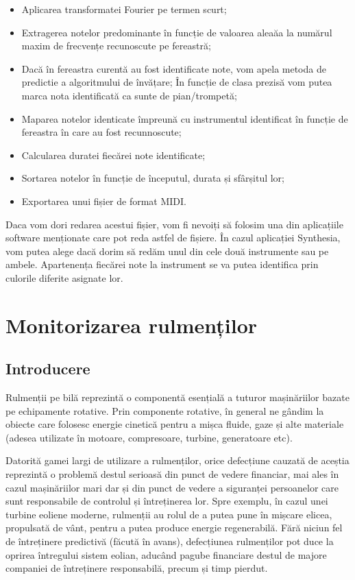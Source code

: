 \documentclass[a4paper,12pt]{report}
\begin{document}
	\begin{itemize}
		\item Aplicarea transformatei Fourier pe termen scurt;
		\item Extragerea notelor predominante în funcție de valoarea aleaăa la numărul maxim de frecvențe recunoscute pe fereastră;
		\item Dacă în fereastra curentă au fost identificate note, vom apela metoda de predictie a algoritmului de învățare; În funcție de clasa prezisă vom putea marca nota identificată ca sunte de pian/trompetă;
		\item Maparea notelor identicate împreună cu instrumentul identificat în funcție de fereastra în care au fost recunnoscute;
		\item Calcularea duratei fiecărei note identificate;
		\item Sortarea notelor în funcție de începutul, durata și sfârșitul lor;
		\item Exportarea unui fișier de format MIDI.
	\end{itemize}
	
	Daca vom dori redarea acestui fișier, vom fi nevoiți să folosim una din aplicațiile software menționate care pot reda astfel de fișiere. În cazul aplicației Synthesia, vom putea alege dacă dorim să redăm unul din cele două instrumente sau pe ambele. Apartenența fiecărei note la instrument se va putea identifica prin culorile diferite asignate lor.
	
   \clearpage
   \section{Monitorizarea rulmenților}  
    \subsection{Introducere}
    	Rulmenții pe bilă reprezintă o componentă esențială a tuturor mașinăriilor bazate pe echipamente rotative. Prin componente rotative, în general ne gândim la obiecte care folosesc energie cinetică pentru a mișca fluide, gaze și alte materiale (adesea utilizate în motoare, compresoare, turbine, generatoare etc).
    	
    	Datorită gamei largi de utilizare a rulmenților, orice defecțiune cauzată de aceștia reprezintă o problemă destul serioasă din punct de vedere financiar, mai ales în cazul mașinăriilor mari dar și din punct de vedere a siguranței persoanelor care sunt responsabile de controlul și întreținerea lor. Spre exemplu, în cazul unei turbine eoliene moderne, rulmenții au rolul de a putea pune în mișcare elicea, propulsată de vânt, pentru a putea produce energie regenerabilă. Fără niciun fel de întreținere predictivă (făcută în avans), defecțiunea rulmenților pot duce la oprirea întregului sistem eolian, aducând pagube financiare destul de majore companiei de întreținere responsabilă, precum și timp pierdut. 
    	
\end{document}
